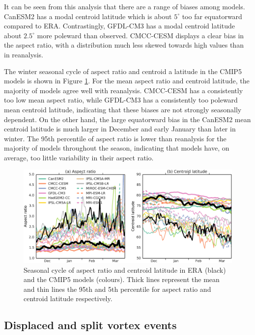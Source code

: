It can be seen from this analysis that there are a range of biases among
models. CanESM2 has a modal centroid latitude which is about $5^{\circ}$ too far
equatorward compared to ERA. Contrastingly, GFDL-CM3 has a modal centroid
latitude about $2.5^{\circ}$ more poleward than observed. CMCC-CESM displays a
clear bias in the aspect ratio, with a distribution much less skewed towards
high values than in reanalysis.

The winter seasonal cycle of aspect ratio and centroid a latitude in the CMIP5
models is shown in Figure \ref{fig:cmip5_moments_stats_seas}. For the mean
aspect ratio and centroid latitude, the majority of models agree well with
reanalysis. CMCC-CESM has a consistently too low mean aspect ratio, while
GFDL-CM3 has a consistently too poleward mean centroid latitude, indicating that
these biases are not strongly seasonally dependent. On the other hand, the large
equatorward bias in the CanESM2 mean centroid latitude is much larger in
December and early January than later in winter. The 95th percentile of aspect
ratio is lower than reanalysis for the majority of models throughout the season,
indicating that models have, on average, too little variability in their aspect
ratio.
\begin{figure}
 \centering
 \noindent\includegraphics[width=\textwidth]{figures/chapter-models/moments_seasonal_stats.pdf}
 \caption[Seasonal cycle of moment diagnostics in the CMIP5 models]{Seasonal
   cycle of aspect ratio and centroid latitude in ERA (black) and the CMIP5
   models (colours). Thick lines represent the mean and thin lines the 95th and
   5th percentile for aspect ratio and centroid latitude respectively.}
 \label{fig:cmip5_moments_stats_seas}
\end{figure}


\subsection{Displaced and split vortex events}

